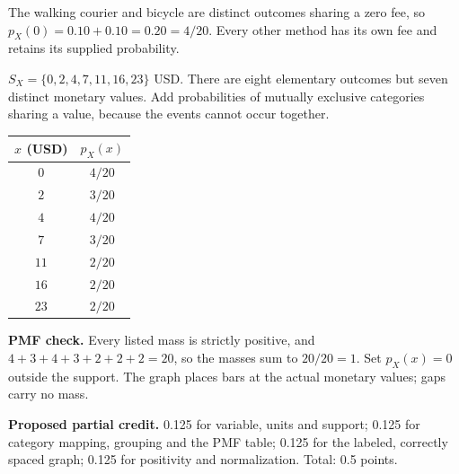 The walking courier and bicycle are distinct outcomes sharing a zero fee, so $p_X(0)=0.10+0.10=0.20=4/20$. Every other method has its own fee and retains its supplied probability.

$S_X=\{0,2,4,7,11,16,23\}$ USD. There are eight elementary outcomes but seven distinct monetary values. Add probabilities of mutually exclusive categories sharing a value, because the events cannot occur together.

\begin{center}
\begin{tabular}{cc}\toprule
$x$ (USD) & $p_X(x)$\\\midrule
$0$ & $4/20$\\
$2$ & $3/20$\\
$4$ & $4/20$\\
$7$ & $3/20$\\
$11$ & $2/20$\\
$16$ & $2/20$\\
$23$ & $2/20$\\
\bottomrule\end{tabular}
\end{center}


\begin{center}\end{center}

\textbf{PMF check.} Every listed mass is strictly positive, and $4+3+4+3+2+2+2=20$, so the masses sum to $20/20=1$. Set $p_X(x)=0$ outside the support. The graph places bars at the actual monetary values; gaps carry no mass.

\textbf{Proposed partial credit.} 0.125 for variable, units and support; 0.125 for category mapping, grouping and the PMF table; 0.125 for the labeled, correctly spaced graph; 0.125 for positivity and normalization. Total: 0.5 points.

